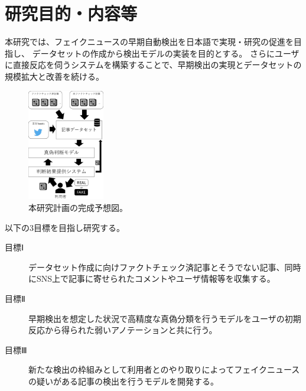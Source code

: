 
\section{研究目的・内容等}

\vspace{20pt}
本研究では、フェイクニュースの早期自動検出を日本語で実現・研究の促進を目指し、
データセットの作成から検出モデルの実装を目的とする。
さらにユーザに直接反応を伺うシステムを構築することで、早期検出の実現とデータセットの規模拡大と改善を続ける。


\setlength\intextsep{0pt}
\setlength\textfloatsep{0pt}
\begin{figure}
    \vspace{-2\baselineskip}
    \centering
    \includegraphics[width=0.3\textwidth]{figs/dataset.pdf}
    \vspace{-1cm} 
    \caption{本研究計画の完成予想図。}
    \label{fig:dataset}
    \vspace{-3\baselineskip}
\end{figure}

以下の3目標を目指し研究する。
\begin{description}
    \item[目標Ⅰ] データセット作成に向けファクトチェック済記事とそうでない記事、同時にSNS上で記事に寄せられたコメントやユーザ情報等を収集する。
    \item[目標Ⅱ] 早期検出を想定した状況で高精度な真偽分類を行うモデルをユーザの初期反応から得られた弱いアノテーションと共に行う。
    \item[目標Ⅲ] 新たな検出の枠組みとして利用者とのやり取りによってフェイクニュースの疑いがある記事の検出を行うモデルを開発する。
\end{description}

